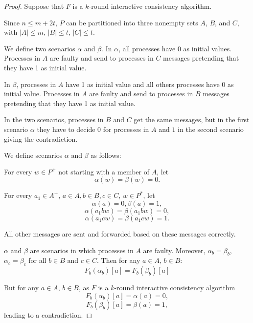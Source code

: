 \begin{proof}
  Suppose that $F$ is a $k$-round  interactive consistency algorithm. 
  
  Since $n \leqslant
  m+2t$, $P$ can be partitioned into three nonempty sets $A$, $B$, and $C$,
  with $| A | \leqslant m$, $| B | \leqslant t$, $| C | \leqslant t$. 
  
   We define two scenarios $\alpha$ and $\beta$.
  In $\alpha$, all processes have 0 as initial values.
  Processes in $A$ are faulty and send  to processes in $C$  messages
  pretending that they have  1 as initial value. 
  
   In $\beta$, processes in $A$ have 1 as initial value and all  others processes have 0 as initial value.
  Processes in $A$ are faulty and send to processes in $B$ messages 
  pretending that they have 1 as initial value.
  

  
    In the two scenarios, processes in $B$ and $C$  get the same messages, but in the first scenario $\alpha$
  they have to decide 0 for processes in $A$ and $1$ in the second scenario giving the contradiction.
  
  We
  define scenarios $\alpha$ and $\beta$ as follows:
  \begin{enumerateroman}
    \item For every $w \in P^{+}$ not starting with a member of $A$, let
    \[ \alpha ( w ) = \beta ( w ) =0. \]
    \item For every $a_{1}  \in A^{+}$, $a \in A,b \in B,c
    \in C$, $w \in P^{\ast}$, let
    \[ \alpha ( a ) =0, \beta ( a ) =1, \]
    \[ \alpha ( a_{1}  b w ) = \beta ( a_{1}  b w ) =0, \]
    \[ \alpha ( a_{1}  c w ) = \beta ( a_{1}  c w ) =1. \]
    \item All other messages are sent and forwarded based on these messages
    correctly.
  \end{enumerateroman}
  
  $\alpha$ and $\beta$ are scenarios in which processes in $A$ are faulty.
  Moreover, $\alpha_{b} =
  \beta_{b}$, $\alpha_{c} = \beta_{c}$ for all $b \in B$ and $c \in C$. 
  Then for any $a \in A$, $b \in B$:
   \[ F_b ( \alpha_{b} )[a] =F_b ( \beta_{b} )[a]  \]

  
But for any $a \in A$, $b \in B$, as $F$ is a $k$-round  interactive consistency algorithm
  \[ F_b ( \alpha_{b} )[a] = \alpha ( a )
     =0, \]
       \[ F_b ( \beta_{b} )[a] = \beta ( a )
     =1, \]
  leading to a contradiction.
\end{proof}

